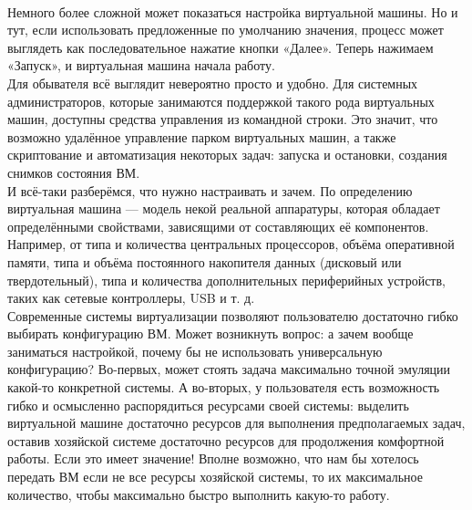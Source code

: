 \documentclass[14pt, a4paper]{article}
\begin{document}
\begin{figure}[h]
    \centering
    \\
    \label{framework} 
\end{figure}

Немного более сложной может показаться настройка виртуальной машины. Но и тут, если
использовать предложенные по умолчанию значения, процесс может выглядеть как последовательное
нажатие кнопки «Далее». Теперь нажимаем «Запуск», и виртуальная машина начала работу.\\

Для обывателя всё выглядит невероятно просто и удобно. Для системных администраторов, которые
занимаются поддержкой такого рода виртуальных машин, доступны средства управления из
командной строки. Это значит, что возможно удалённое управление парком виртуальных машин, а
также скриптование и автоматизация некоторых задач: запуска и остановки, создания снимков
состояния ВМ.\\

И всё-таки разберёмся, что нужно настраивать и зачем. По определению виртуальная машина —
модель некой реальной аппаратуры, которая обладает определёнными свойствами, зависящими от
составляющих её компонентов. Например, от типа и количества центральных процессоров, объёма
оперативной памяти, типа и объёма постоянного накопителя данных (дисковый или твердотельный),
типа и количества дополнительных периферийных устройств, таких как сетевые контроллеры, USB и
т. д.\\

Современные системы виртуализации позволяют пользователю достаточно гибко выбирать
конфигурацию ВМ. Может возникнуть вопрос: а зачем вообще заниматься настройкой, почему бы не
использовать универсальную конфигурацию? Во-первых, может стоять задача максимально точной
эмуляции какой-то конкретной системы. А во-вторых, у пользователя есть возможность гибко и
осмысленно распорядиться ресурсами своей системы: выделить виртуальной машине достаточно ресурсов для выполнения предполагаемых задач, оставив хозяйской системе достаточно ресурсов
для продолжения комфортной работы. Если это имеет значение! Вполне возможно, что нам бы
хотелось передать ВМ если не все ресурсы хозяйской системы, то их максимальное количество,
чтобы максимально быстро выполнить какую-то работу.\\
\end{document}
